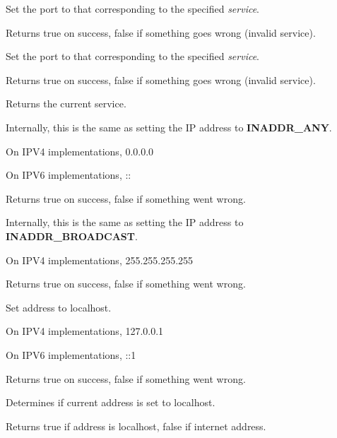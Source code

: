 Set the port to that corresponding to the specified {\it service}.


Returns true on success, false if something goes wrong
(invalid service).


Set the port to that corresponding to the specified {\it service}.


Returns true on success, false if something goes wrong
(invalid service).


Returns the current service.

%
%

\label{wxIPaddressanyaddress}


Internally, this is the same as setting the IP address
to {\bf INADDR\_ANY}.

On IPV4 implementations, 0.0.0.0

On IPV6 implementations, ::


Returns true on success, false if something went wrong.

%
%

\label{wxipaddressbroadcastaddress}


Internally, this is the same as setting the IP address
to {\bf INADDR\_BROADCAST}.

On IPV4 implementations, 255.255.255.255


Returns true on success, false if something went wrong.

%
%

\label{wxipaddresslocalhost}


Set address to localhost. 

On IPV4 implementations, 127.0.0.1

On IPV6 implementations, ::1


Returns true on success, false if something went wrong.

\label{wxipaddressislocalhost}


Determines if current address is set to localhost. 


Returns true if address is localhost, false if internet address.

